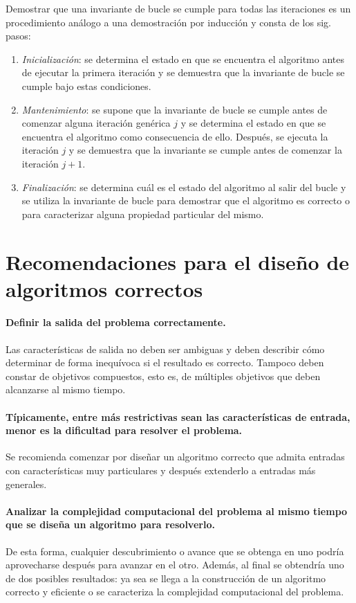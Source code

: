 Demostrar que una invariante de bucle se cumple para todas las iteraciones es un procedimiento análogo a una demostración por inducción y consta de los sig. pasos: 
\begin{enumerate}
  \item \emph{Inicialización}: se determina el estado en que se encuentra el algoritmo antes de ejecutar la primera iteración y se demuestra que la invariante de bucle se cumple bajo estas condiciones.
  \item \emph{Mantenimiento}: se supone que la invariante de bucle se cumple antes de comenzar alguna iteración genérica \(j\) y se determina el estado en que se encuentra el algoritmo como consecuencia de ello. 
  Después, se ejecuta la iteración \(j\) y se demuestra que la invariante se cumple antes de comenzar la iteración \(j+1\).
  \item \emph{Finalización}: se determina cuál es el estado del algoritmo al salir del bucle y se utiliza la invariante de bucle para demostrar que el algoritmo es correcto o para caracterizar alguna propiedad particular del mismo. 
\end{enumerate}

\section{Recomendaciones para el diseño de algoritmos correctos}

\paragraph*{Definir la salida del problema correctamente.}{%
  Las características de salida no deben ser ambiguas y deben describir cómo determinar de forma inequívoca si el resultado es correcto.
  Tampoco deben constar de objetivos compuestos, esto es, de múltiples objetivos que deben alcanzarse al mismo tiempo.
}

\paragraph*{Típicamente, entre más restrictivas sean las características de entrada, menor es la dificultad para resolver el problema.}{
  Se recomienda comenzar por diseñar un algoritmo correcto que admita entradas con características muy particulares y después extenderlo a entradas más generales. 
}

\paragraph*{Analizar la complejidad computacional del problema al mismo tiempo que se diseña un algoritmo para resolverlo.}{
  De esta forma, cualquier descubrimiento o avance que se obtenga en uno podría aprovecharse después para avanzar en el otro.
  Además, al final se obtendría uno de dos posibles resultados: ya sea se llega a la construcción de un algoritmo correcto y eficiente o se caracteriza la complejidad computacional del problema.
}

